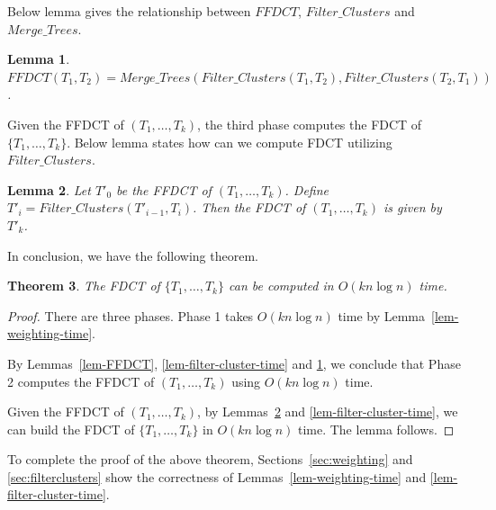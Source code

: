 \documentclass[final,1p,times]{elsarticle}
\newtheorem{theorem}{Theorem}
\newtheorem{lemma}[theorem]{Lemma}
\begin{document}
    Below lemma gives the relationship between $FFDCT$, $Filter\_Clusters$ and $Merge\_Trees$.
    \begin{lemma}
	    \label{lem-FFDCT-merge-filter}
	    $FFDCT(T_1, T_2) = Merge\_Trees( Filter\_Clusters(T_1, T_2), Filter\_Clusters(T_2, T_1) )$.
    \end{lemma}


    Given the FFDCT of $(T_1, \ldots, T_k)$, the third phase computes the FDCT of $\{ T_1, \ldots, T_k \}$. Below lemma states how can we compute FDCT utilizing $Filter\_Clusters$.
    \begin{lemma}
	    \label{lem-FDCT}
	    Let $T'_0$ be the FFDCT of $(T_1, \ldots, T_k)$. Define $T'_i = Filter\_Clusters(T'_{i-1}, T_i)$. Then the FDCT of $(T_1, \ldots, T_k)$ is given by $T'_k$.

    \end{lemma}



    In conclusion, we have the following theorem.
    \begin{theorem}
    The FDCT of $\{T_1, \ldots, T_k\}$ can be computed in $O(kn \log n)$ time.
    \end{theorem}
    \begin{proof}
	    There are three phases.
	    Phase 1 takes $O(k n \log n)$ time by Lemma~\ref{lem-weighting-time}.

	    By Lemmas~\ref{lem-FFDCT}, \ref{lem-filter-cluster-time} and \ref{lem-FFDCT-merge-filter}, we conclude that Phase 2 computes the FFDCT of $(T_1, \ldots, T_k)$ using $O(k n \log n)$ time.


	    Given the FFDCT of $(T_1, \ldots, T_k)$, by Lemmas~\ref{lem-FDCT} and \ref{lem-filter-cluster-time}, we can build the FDCT of $\{T_1, \ldots, T_k\}$ in $O(kn \log n)$ time.
	    The lemma follows.
    \end{proof}

    To complete the proof of the above theorem, Sections~\ref{sec:weighting} and \ref{sec:filterclusters} show the correctness of Lemmas~\ref{lem-weighting-time} and \ref{lem-filter-cluster-time}.

\end{document}
